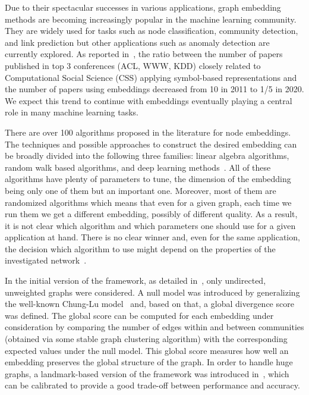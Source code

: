 \documentclass[11pt]{article}
\begin{document}
Due to their spectacular successes in various applications, graph embedding methods are becoming increasingly popular in the machine learning community. They are widely used for tasks such as node classification, community detection, and link prediction but other applications such as anomaly detection are currently explored. As reported in~\citep{chen2021symbols}, the ratio between the number of papers published in top 3 conferences (ACL, WWW, KDD) closely related to Computational Social Science (CSS) applying symbol-based representations and the number of papers using embeddings decreased from 10 in 2011 to 1/5 in 2020. We expect this trend to continue with embeddings eventually playing a central role in many machine learning tasks.

There are over 100 algorithms proposed in the literature for node embeddings. The techniques and possible approaches to construct the desired embedding can be broadly divided into the following three families: linear algebra algorithms, random walk based algorithms, and deep learning methods~\cite{aggarwal2021machine,book}. All of these algorithms have plenty of parameters to tune, the dimension of the embedding being only one of them but an important one. Moreover, most of them are randomized algorithms which means that even for a given graph, each time we run them we get a different embedding, possibly of different quality. As a result, it is not clear which algorithm and which parameters one should use for a given application at hand. There is no clear winner and, even for the same application, the decision which algorithm to use might depend on the properties of the investigated network~\cite{Arash}. 

\medskip

In the initial version of the framework, as detailed in~\cite{Embedding_Complex_Networks}, only undirected, unweighted graphs were considered. A null model was introduced by generalizing the well-known Chung-Lu model~\cite{CL} and, based on that, a global divergence score was defined. The global score can be computed for each embedding under consideration by comparing the number of edges within and between communities (obtained via some stable graph clustering algorithm) with the corresponding expected values under the null model. This global score measures how well an embedding preserves the global structure of the graph. In order to handle huge graphs, a landmark-based version of the framework was introduced in~\cite{Embedding_Complex_Networks_Scalable}, which can be calibrated to provide a good trade-off between performance and accuracy. 
\end{document}
